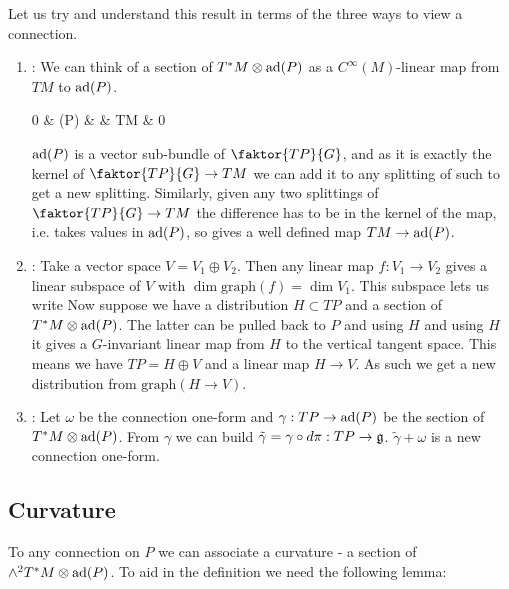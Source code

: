 \documentclass{article}
\begin{document}
Let us try and understand this result in terms of the three ways to view a connection. 
\begin{enumerate}
	\item {}: We can think of a section of $T^\ast M \otimes \operatorname{ad}(P)$ as a $C^\infty(M)$-linear map from $TM$ to $\operatorname{ad}(P)$. 
	\begin{tkz}
		0 \arrow[r] & \ad(P) \arrow[r] &  \arrow[r] & TM \arrow[r] \arrow[ll,dashed, bend left=20] & 0 
	\end{tkz}
$\operatorname{ad}(P)$ is a vector sub-bundle of $\faktor{TP}{G}$, and as it is exactly the kernel of $\faktor{TP}{G} \to TM$ we can add it to any splitting of such to get a new splitting. Similarly, given any two splittings of $\faktor{TP}{G} \to TM$ the difference has to be in the kernel of the map, i.e. takes values in $\operatorname{ad}(P)$, so gives a well defined map $TM \to \operatorname{ad}(P)$. 
\item {}: Take a vector space $V=V_1 \oplus V_2$. Then any linear map $f:V_1 \to V_2$ gives a linear subspace of $V$ 
with $\dim \text{graph}(f) = \dim V_1$. This subspace lets us write 
Now suppose we have a distribution $H \subset TP$ and a section of $T^\ast M \otimes \operatorname{ad}(P)$. The latter can be pulled back to $P$ and using $H$ and using $H$ it gives a $G$-invariant linear map from $H$ to the vertical tangent space. This means we have $TP = H \oplus V$ and a linear map $H \to V$. As such we get a new distribution from $\text{graph}(H \to V)$. 
\item {}: Let $\omega$ be the connection one-form and $\gamma:TP \to \operatorname{ad}(P)$ be the section of $T^\ast M \otimes \operatorname{ad}(P)$. From $\gamma$ we can build $\tilde{\gamma} = \gamma \circ d\pi : TP \to \mathfrak{g}$. $\tilde{\gamma} + \omega$ is a new connection one-form. 
\end{enumerate}

\subsection{Curvature}

To any connection on $P$ we can associate a curvature - a section of $\wedge^2 T^\ast M \otimes \operatorname{ad}(P)$. To aid in the definition we need the following lemma:
\end{document}
